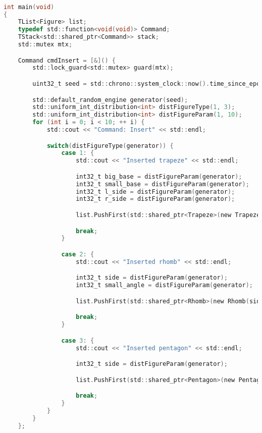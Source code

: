 \begin{lstlisting}[language=C]

int main(void)
{
    TList<Figure> list;
    typedef std::function<void(void)> Command;
    TStack<std::shared_ptr<Command>> stack;
    std::mutex mtx;

    Command cmdInsert = [&]() {
        std::lock_guard<std::mutex> guard(mtx);

        uint32_t seed = std::chrono::system_clock::now().time_since_epoch().count();

        std::default_random_engine generator(seed);
        std::uniform_int_distribution<int> distFigureType(1, 3);
        std::uniform_int_distribution<int> distFigureParam(1, 10);
        for (int i = 0; i < 10; ++ i) {
            std::cout << "Command: Insert" << std::endl;

            switch(distFigureType(generator)) {
                case 1: {
                    std::cout << "Inserted trapeze" << std::endl;

                    int32_t big_base = distFigureParam(generator);
                    int32_t small_base = distFigureParam(generator);
                    int32_t l_side = distFigureParam(generator);
                    int32_t r_side = distFigureParam(generator);

                    list.PushFirst(std::shared_ptr<Trapeze>(new Trapeze(small_base, big_base, l_side, r_side)));

                    break;
                }

                case 2: {
                    std::cout << "Inserted rhomb" << std::endl;

                    int32_t side = distFigureParam(generator);
                    int32_t small_angle = distFigureParam(generator);

                    list.PushFirst(std::shared_ptr<Rhomb>(new Rhomb(side, small_angle)));

                    break;
                }

                case 3: {
                    std::cout << "Inserted pentagon" << std::endl;

                    int32_t side = distFigureParam(generator);

                    list.PushFirst(std::shared_ptr<Pentagon>(new Pentagon(side)));

                    break;
                }
            }
        }
    };



\end{lstlisting}
